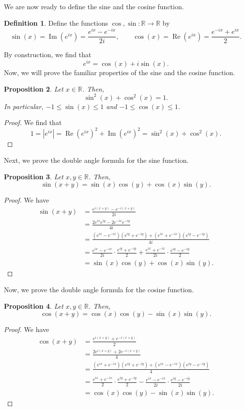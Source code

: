 \documentclass[a4paper, openany]{memoir}
\theoremstyle{definition}
\newtheorem{definition}{Definition}[section]
\theoremstyle{plain}
\newtheorem{proposition}[definition]{Proposition}
\begin{document}
We are now ready to define the sine and the cosine function.
\begin{definition}
Define the functions $\cos, \sin: \mathbb{R} \to \mathbb{R}$ by
\[\sin (x) = \operatorname{Im}(e^{ix}) = \frac{e^{ix} - e^{-ix}}{2i}, \qquad \cos (x) = \operatorname{Re}(e^{ix}) = \frac{e^{-ix} + e^{ix}}{2}.\]
\end{definition}
\noindent By construction, we find that
\[e^{ix} = \cos (x) + i \sin (x).\]
Now, we will prove the familiar properties of the sine and the cosine function.
\begin{proposition}
Let $x \in \mathbb{R}$. Then,
\[\sin^2 (x) + \cos^2 (x) = 1.\]
In particular, $-1 \leqslant \sin (x) \leqslant 1$ and $-1 \leqslant \cos (x) \leqslant 1$.
\end{proposition}
\begin{proof}
We find that
\[1 = |e^{ix}| = \operatorname{Re}(e^{ix})^2 + \operatorname{Im}(e^{ix})^2 = \sin^2 (x) + \cos^2 (x).\]
\end{proof}
\noindent Next, we prove the double angle formula for the sine function.
\begin{proposition}
Let $x, y \in \mathbb{R}$. Then,
\[\sin(x + y) = \sin(x) \cos(y) + \cos(x) \sin(y).\]
\end{proposition}
\begin{proof}
We have
\begin{align*}
    \sin (x+y) &= \frac{e^{i(x+y)} - e^{-i(x+y)}}{2i} \\
    &= \frac{2e^{ix} e^{iy} - 2e^{-ix} e^{-iy}}{4i} \\
    &= \frac{(e^{ix} - e^{-ix})(e^{iy} + e^{-iy}) + (e^{ix} + e^{-ix})(e^{iy} - e^{-iy})}{4i} \\
    &= \frac{e^{ix} - e^{-ix}}{2i} \cdot \frac{e^{iy} + e^{-iy}}{2} + \frac{e^{ix} + e^{-ix}}{2i} \cdot \frac{e^{iy} - e^{-iy}}{2} \\
    &= \sin (x) \cos (y) + \cos (x) \sin (y).
\end{align*}
\end{proof}
\noindent Now, we prove the double angle formula for the cosine function.
\begin{proposition}
Let $x, y \in \mathbb{R}$. Then,
\[\cos(x + y) = \cos(x) \cos(y) - \sin(x) \sin(y).\]
\end{proposition}
\begin{proof}
We have
\begin{align*}
    \cos (x+y) &= \frac{e^{i(x+y)} + e^{-i(x+y)}}{2} \\
    &= \frac{2e^{i(x+y)} + 2e^{-i(x+y)}}{4} \\
    &= \frac{(e^{ix} + e^{-ix})(e^{iy} + e^{-iy}) + (e^{ix} - e^{-ix})(e^{iy} - e^{-iy})}{4} \\
    &= \frac{e^{ix} + e^{-ix}}{2} \cdot \frac{e^{iy} + e^{-iy}}{2} - \frac{e^{ix} - e^{-ix}}{2i} \cdot \frac{e^{iy} - e^{-iy}}{2i} \\
    &= \cos (x) \cos (y) - \sin (x) \sin(y).
\end{align*}
\end{proof}
\end{document}
